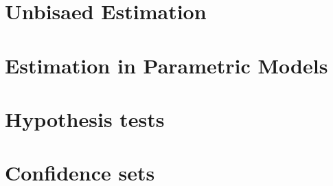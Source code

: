 \documentclass{article}
\theoremstyle{definition}
\begin{document}
\section{Unbisaed Estimation}

\section{Estimation in Parametric Models}


\section{Hypothesis tests}

\section{Confidence sets}
\end{document}
